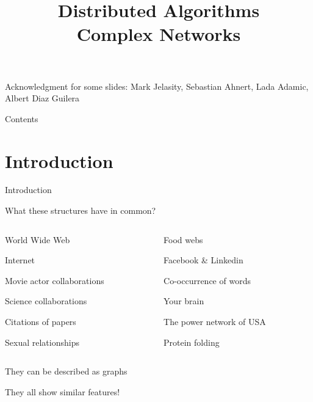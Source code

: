 \title[DS - Complex Network]{\textbf{Distributed Algorithms}\\Complex Networks}



\newcommand{\Path}{\ell}
\newcommand{\Diam}{\mathit{diam}}

\begin{frame}
\titlepage

{\footnotesize
Acknowledgment for some slides: Mark Jelasity, Sebastian Ahnert, Lada Adamic, Albert Diaz Guilera
}


\end{frame}

\begin{frame}[shrink]{Contents}
\tableofcontents
\end{frame}


\section{Introduction}

\begin{frame}{Introduction}

\begin{block}{What these structures have in common?}

\begin{columns}
\begin{column}{0.5\textwidth}
\BI
\item World Wide Web
\item Internet
\item Movie actor collaborations
\item Science collaborations
\item Citations of papers
\item Sexual relationships
\EI
\end{column}
\begin{column}{0.5\textwidth}
\BI
\item Food webs
\item Facebook \& Linkedin
\item Co-occurrence of words
\item Your brain
\item The power network of USA
\item Protein folding
\EI
\end{column}
\end{columns}
\end{block}

\pause
\bigskip
\BI
\item They can be described as graphs
\pause
\item They all show similar features!
\EI

\end{frame}


